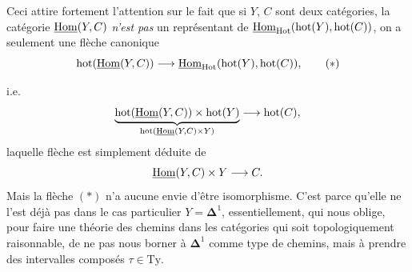 Ceci attire fortement l'attention sur le fait que si $Y$, $C$ sont deux catégories, la catégorie $\underline{\mathrm{Hom}}(Y,C)$ \textit{n'est pas} un représentant de $\underline{\mathrm{Hom}}_{\mathrm{Hot}}(\mathrm{hot}(Y),\mathrm{hot}(C))$, on a seulement une flèche canonique
\[ \mathrm{hot}(\underline{\mathrm{Hom}}(Y,C)) \longrightarrow \underline{\mathrm{Hom}}_{\mathrm{Hot}}(\mathrm{hot}(Y),\mathrm{hot}(C)), \tag*{$(*)$} \]


i.e.
\[
\underbrace{\mathrm{hot}(\underline{\mathrm{Hom}}(Y,C))\times\mathrm{hot}(Y)}_{\mathrm{hot}(\underline{\mathrm{Hom}}(Y,C)\times Y)}\longrightarrow\mathrm{hot}(C),
\]
laquelle flèche est simplement déduite de
\[
\underline{\mathrm{Hom}}(Y,C)\times Y\longrightarrow C.
\]
Mais la flèche $(*)$ n'a aucune envie d'être isomorphisme. C'est parce qu'elle ne l'est déjà pas dans le cas particulier $Y=\mathbf{\Delta}^1$, essentiellement, qui nous oblige, pour faire une théorie des chemins dans les catégories qui soit topologiquement raisonnable, de ne pas nous borner à $\mathbf{\Delta}^1$ comme type de chemins, mais à prendre des intervalles composés $\tau\in\mathrm{Ty}$.

